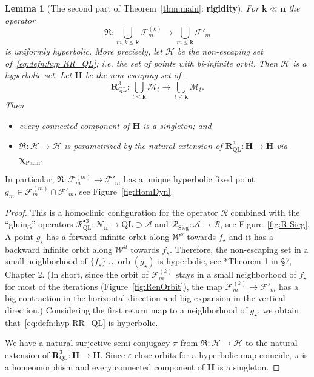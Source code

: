 \documentclass{amsart}
\newcommand{\1}{{\mathbb 1 }}
\newcommand\NN{\mathcal{N}}
\newcommand{\Mandel}{{\mathcal{M}}}
\newcommand\Hors{{\mathcal H}}
\newcommand\mHors{{\boldsymbol H}}
\newcommand\RRR{{\mathfrak R}}
\newcommand\RR{\mathcal{R}}
\newcommand\mRR{\boldsymbol R}%
\newcommand{\bbn}{{\mathbf n}}
\newcommand{\bbk}{{\mathbf k}}
\newcommand{\str}{{\star}}
\newcommand\strai{{\boldsymbol \chi}}
\newcommand\WW{\mathcal{W}}
\newcommand\BB{\mathcal{B}}
\renewcommand\AA{\mathcal{A}}
\newcommand\Sieg{{\operatorname{Sieg}}}
\newcommand\Pacm{{\operatorname{Pacm}}}
\newcommand{\bFol}{{\boldsymbol{ \mathcal F}}}
\newtheorem{lem}[thm]{Lemma}
\theoremstyle{remark}
\numberwithin{equation}{section}
\theoremstyle{definition}
\def\QL{{\text{QL}}}
\newcommand{\orb}{\operatorname{orb}}
\theoremstyle{nonumberbreak}
\begin{document}
\begin{lem}[The second part of Theorem~\ref{thm:main}: {\bf rigidity}]
 For $\bbk\ll \bbn$ the operator 
\begin{equation}
\label{eq:defn:hyp RR_QL}
 \RRR\colon \bigcup_{m,k\le \bbk}\bFol_m^{(k)}\to \bigcup_{m\le \bbk}\bFol'_m
\end{equation}
is uniformly hyperbolic. More precisely, let $\Hors$ be the non-escaping set of~\eqref{eq:defn:hyp RR_QL}; i.e. the set of points with bi-infinite orbit. Then $\Hors$ is a hyperbolic set. Let $\mHors$ be the non-escaping set of 
\[ \mRR_\QL^3\colon \bigcup_{t\le \bbk} \Mandel_t \to  \bigcup_{t\le \bbk} \Mandel_t . \]
Then 
\begin{itemize}
\item  every connected component of $\mHors$ is a singleton; and 
\item $ \RRR\colon \Hors \to \Hors$ is parametrized by the natural extension of $\mRR_\QL^3\colon \mHors\to \mHors$ via $\strai_\Pacm$.
\end{itemize}
\end{lem}
\noindent In particular, $\RRR\colon \bFol^{(m)}_m\to \bFol'_m$ has a unique hyperbolic fixed point $g_m\in \bFol^{(m)}_m\cap \bFol'_m$, see Figure~\ref{fig:HomDyn}. 

\begin{proof} This is a homoclinic configuration for the operator $\RR$ combined with the ``gluing'' operators ${\RR_\QL^{\bullet 3}\colon \NN_\bbn\to \QL}\supset\AA$ and $\RR_\Sieg\colon \AA\to \BB$, see Figure~\ref{fig:R Sieg}. A point $g_\str$ has a forward infinite orbit along $\WW^s$ towards $f_\str$ and it has a backward infinite orbit along $\WW^u$ towards $f_\str$. Therefore, the non-escaping set in a small neighborhood of $\{f_\str\}\cup \orb (g_\str)$ is hyperbolic, see \cite{PT}*{Theorem 1 in \S7, Chapter 2}. (In short, since the orbit of $\bFol_m^{(k)}$ stays in a small neighborhood of $f_\str$ for most of the iterations (Figure~\ref{fig:RenOrbit}), the map $\bFol_m^{(k)}\longrightarrow \bFol'_m$ has a big contraction in the horizontal direction and big expansion in the vertical direction.) Considering the first return map to a neighborhood of $g_\str$, we obtain that~\eqref{eq:defn:hyp RR_QL} is hyperbolic. 







We have a natural surjective semi-conjugacy $\pi$ from $ \RRR\colon \Hors \to \Hors$ to the natural extension of $\mRR_\QL^3\colon \mHors\to \mHors$. Since $\varepsilon$-close orbits for a hyperbolic map coincide, $\pi$ is a homeomorphism and every connected component of $\mHors$ is a singleton.
 \end{proof}
 
\end{document}
